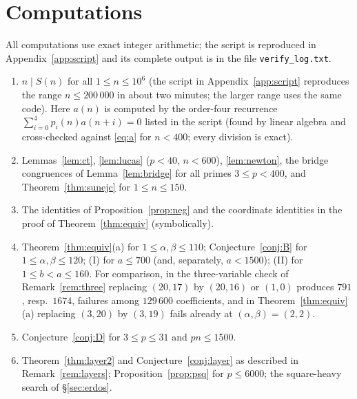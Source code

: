 \documentclass[11pt]{amsart}
\theoremstyle{definition}
\begin{document}
\section{Computations}\label{sec:comp}
All computations use exact integer arithmetic; the script is reproduced in
Appendix~\ref{app:script} and its complete output is in the file \texttt{verify\_log.txt}.
\begin{enumerate}[label=(\arabic*)]
\item $n\mid S(n)$ for all $1\le n\le10^6$ (the script in Appendix~\ref{app:script} reproduces
the range $n\le 200\,000$ in about two minutes; the larger range uses the same code). Here $a(n)$ is computed by the order-four
recurrence $\sum_{i=0}^4p_i(n)a(n+i)=0$ listed in the script (found by linear algebra and
cross-checked against \eqref{eq:a} for $n<400$; every division is exact).
\item Lemmas~\ref{lem:ct}, \ref{lem:lucas} ($p<40$, $n<600$), \ref{lem:newton}, the bridge
congruences of Lemma~\ref{lem:bridge} for all primes $3\le p<400$, and Theorem~\ref{thm:sunejc}
for $1\le n\le150$.
\item The identities of Proposition~\ref{prop:neg} and the coordinate identities in the proof of
Theorem~\ref{thm:equiv} (symbolically).
\item Theorem~\ref{thm:equiv}(a) for $1\le\alpha,\beta\le110$; Conjecture~\ref{conj:B} for
$1\le\alpha,\beta\le120$; (I) for $a\le700$ (and, separately, $a<1500$); (II) for $1\le b<a\le160$.
For comparison, in the three-variable check of Remark~\ref{rem:three} replacing $(20,17)$ by
$(20,16)$ or $(1,0)$ produces $791$, resp.\ $1674$, failures among $129\,600$ coefficients, and in
Theorem~\ref{thm:equiv}(a) replacing $(3,20)$ by $(3,19)$ fails already at $(\alpha,\beta)=(2,2)$.
\item Conjecture~\ref{conj:D} for $3\le p\le31$ and $pn\le1500$.
\item Theorem~\ref{thm:layer2} and Conjecture~\ref{conj:layer} as described in
Remark~\ref{rem:layers}; Proposition~\ref{prop:psq} for $p\le6000$; the square-heavy search of
\S\ref{sec:erdos}.
\end{enumerate}
\end{document}
